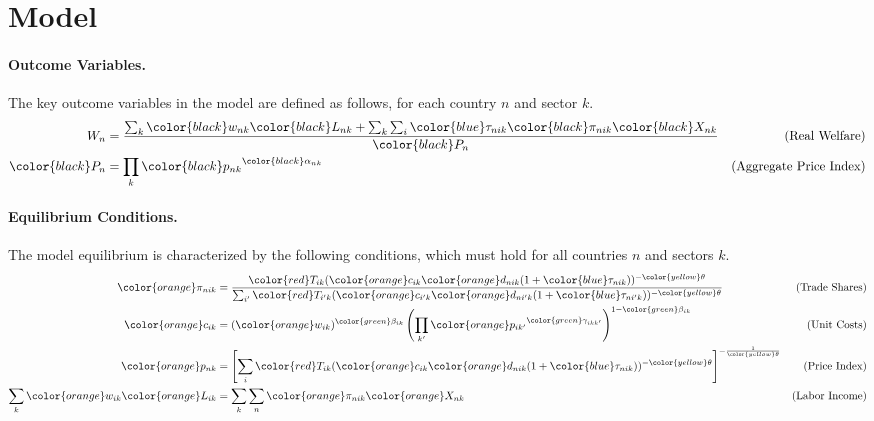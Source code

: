 \section{Model}
\paragraph{Outcome Variables.} The key outcome variables in the model are defined as follows, for each country $n$ and sector $k$.
\begin{align*}
    W_n &= \frac{\sum_{k} {\color{black}w_{nk}} {\color{black}L_{nk}} + \sum_{k} \sum_{i} {\color{blue}\tau_{nik}} {\color{black}\pi_{nik}} {\color{black}X_{nk}}}{{\color{black}P_n}} & \text{(Real Welfare)} \\
    {\color{black}P_n} &= \prod_{k} {\color{black}p_{nk}}^{{\color{black}\alpha_{nk}}} & \text{(Aggregate Price Index)}
\end{align*}

\paragraph{Equilibrium Conditions.} The model equilibrium is characterized by the following conditions, which must hold for all countries $n$ and sectors $k$.
\begin{align*}
    {\color{orange}\pi_{nik}} &= \frac{{\color{red}T_{ik}} ({\color{orange}c_{ik}} {\color{orange}d_{nik}} (1 + {\color{blue}\tau_{nik}}))^{-{\color{yellow}\theta}}}{\sum_{i'} {\color{red}T_{i'k}} ({\color{orange}c_{i'k}} {\color{orange}d_{ni'k}} (1 + {\color{blue}\tau_{ni'k}}))^{-{\color{yellow}\theta}}} & \text{(Trade Shares)} \\
    {\color{orange}c_{ik}} &= ({\color{orange}w_{ik}})^{{\color{green}\beta_{ik}}} \left(\prod_{k'} {\color{orange}p_{ik'}}^{{\color{green}\gamma_{ikk'}}}\right)^{1 - {\color{green}\beta_{ik}}} & \text{(Unit Costs)} \\
    {\color{orange}p_{nk}} &= \left[ \sum_{i} {\color{red}T_{ik}} ({\color{orange}c_{ik}} {\color{orange}d_{nik}} (1 + {\color{blue}\tau_{nik}}))^{-{\color{yellow}\theta}} \right]^{-\frac{1}{{\color{yellow}\theta}}} & \text{(Price Index)} \\
   \sum_{k} {\color{orange}w_{ik}} {\color{orange}L_{ik}} &= \sum_{k} \sum_{n} {\color{orange}\pi_{nik}} {\color{orange}X_{nk}} & \text{(Labor Income)}
\end{align*}

